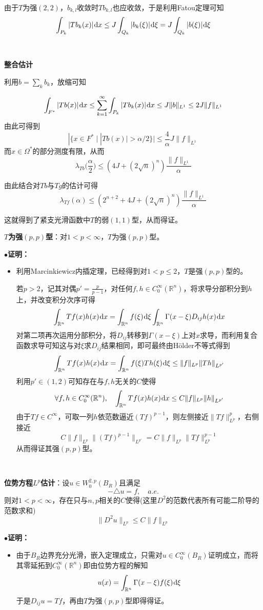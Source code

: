 \documentclass[a4paper,UTF8,fontset=windows,AutoFakeBold]{ctexart}
\newcommand*{\dr}{\hspace{0.07em}\mathrm{d}}
\newcommand{\proo}[1]{{\kaishu $\bullet$\textbf{证明：}
\begin{itemize}
    \item[] #1
\end{itemize}
}}
\begin{document}
{    由于$T$为强$(2,2)$，$b_{k,l}$收敛时$Tb_{k,l}$也应收敛，于是利用Fatou定理可知
    $$\int_{P_k}|Tb_k(x)|\dr x\le J\int_{Q_k}|b_k(\xi)|\dr\xi=J\int_{Q_k}|b(\xi)|\dr\xi$$

    \

    \textbf{整合估计}

    利用$b=\sum_kb_k$，放缩可知

    $$\int_{F^*}|Tb(x)|\dr x\le\sum_{k=1}^\infty\int_{P_k}|Tb_k(x)|\dr x\le J\|b\|_{L^1}\le2J\|f\|_{L^1}$$
    由此可得到
    $$|\{x\in F^*\mid |Tb(x)|>\alpha/2\}|\le\frac{4}{\alpha}J\|f\|_{L^1}$$
    而$x\in\Omega^*$的部分测度有限，从而
    $$\lambda_{Tb}\bigg(\frac{\alpha}{2}\bigg)\le(4J+(2\sqrt{n})^n)\frac{\|f\|_{L^1}}{\alpha}$$
    
    由此结合对$Tb$与$Tg$的估计可得
    $$\lambda_{Tf}(\alpha)\le(2^{n+2}+4J+(2\sqrt{n})^n)\frac{\|f\|_{L^1}}{\alpha}$$

    这就得到了紧支光滑函数中$T$的弱$(1,1)$型，从而得证。
}

\textbf{$T$为强$(p,p)$型}：对$1<p<\infty$，$T$为强$(p,p)$型。

\proo{
    利用Marcinkiewicz内插定理，已经得到对$1<p\le2$，$T$是强$(p,p)$型的。

    若$p>2$，记其对偶$p'=\frac{p}{p-1}$，对任何$f,h\in C_0^\infty(\mathbb{R}^n)$，将求导分部积分到$h$上，并改变积分次序可得
    $$\int_{\mathbb{R}^n}Tf(x)h(x)\dr x=\int_{\mathbb{R}^n}f(\xi)\dr\xi\int_{\mathbb{R}^n}\Gamma(x-\xi)D_{ij}h(x)\dr x$$
    对第二项再次运用分部积分，将$D_{ij}$转移到$\Gamma(x-\xi)$上对$x$求导，而利用复合函数求导可知这与对$\xi$求$D_{ij}$结果相同，即可最终由H\"older不等式得到
    $$\int_{\mathbb{R}^n}Tf(x)h(x)\dr x=\int_{\mathbb{R}^n}f(\xi)Th(\xi)\dr\xi\le\|f\|_{L^p}\|Th\|_{L^{p'}}$$
    利用$p'\in(1,2)$可知存在与$f,h$无关的$C$使得
    $$\forall f,h\in C_0^\infty(\mathbb{R}^n),\quad\int_{\mathbb{R}^n}Tf(x)h(x)\dr x\le C\|f\|_{L^p}\|h\|_{L^{p'}}$$
    由于$Tf\in C^\infty$，可取一列$h$依范数逼近$(Tf)^{p-1}$，则左侧接近$\|Tf\|_{L^p}^p$，右侧接近
    $$C\|f\|_{L^p}\|(Tf)^{p-1}\|_{L^{p'}}=C\|f\|_{L^p}\|Tf\|_{L^p}^{p-1}$$
    从而得证其强$(p,p)$型。
}

\

\textbf{位势方程$L^p$估计}：设$u\in W_0^{2,p}(B_R)$且满足
$$-\triangle u=f,\quad a.e.$$
则对$1<p<\infty$，存在只与$n,p$相关的$C$使得(这里$D^2$的范数代表所有可能二阶导的范数求和)
$$\|D^2u\|_{L^p}\le C\|f\|_{L^p}$$
\proo{
    由于$B_R$边界充分光滑，嵌入定理成立，只需对$u\in C_0^\infty(B_R)$证明成立，而将其零延拓到$C_0^\infty(\mathbb{R}^n)$即由位势方程的解知
    $$u(x)=\int_{\mathbb{R}^n}\Gamma(x-\xi)f(\xi)\dr\xi$$
    于是$D_{ij}u=Tf$，再由$T$为强$(p,p)$型即得得证。
}
\end{document}
